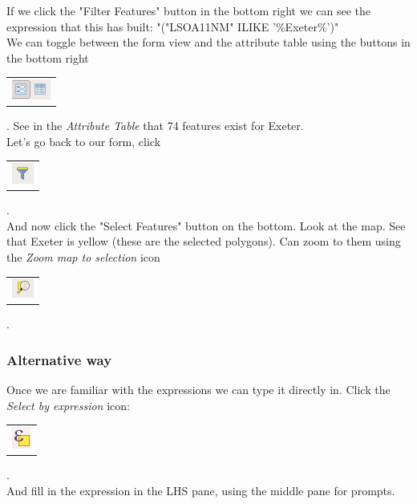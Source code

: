 If we click the "Filter Features" button in the bottom right we can see the expression that this has built: "("LSOA11NM" ILIKE '\%Exeter\%')"\\

We can toggle between the form view and the attribute table using the buttons in the bottom right
\begin{tabular}{@{}c@{}}\includegraphics[width=4ex]{images/form_table_icons.png}\end{tabular}. See in the \textit{Attribute Table} that 74 features exist for Exeter.\\

Let's go back to our form, click  
\begin{tabular}{@{}c@{}}\includegraphics[width=4ex]{images/select_features_form_icon.png}\end{tabular}.\\

And now click the "Select Features" button on the bottom. Look at the map. See that Exeter is yellow (these are the selected polygons). Can zoom to them using the \textit{Zoom map to selection} icon
\begin{tabular}{@{}c@{}}\includegraphics[width=4ex]{images/zoom_map_to_selection_icon.png}\end{tabular}.\\

\subsubsection{Alternative way}

Once we are familiar with the expressions we can type it directly in. Click the \textit{Select by expression} icon: 
\begin{tabular}{@{}c@{}}\includegraphics[width=4ex]{images/select_by_expression_icon.png}\end{tabular}.\\

And fill in the expression in the LHS pane, using the middle pane for prompts.


